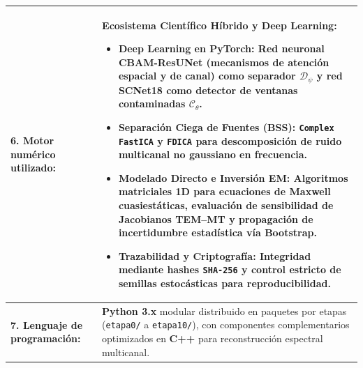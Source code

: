 \documentclass[11pt,letterpaper]{article}
\begin{document}
\begin{tcolorbox}
\begin{tabularx}{\textwidth}{@{} p{4.6cm} X @{}}
    \textbf{6. Motor numérico utilizado:} & 
    \textbf{Ecosistema Científico Híbrido y Deep Learning:}
    \begin{itemize}[leftmargin=1.2em, topsep=2pt, itemsep=1pt]
        \item \textbf{Deep Learning en PyTorch:} Red neuronal \textbf{CBAM-ResUNet} (mecanismos de atención espacial y de canal) como separador $\mathcal{D}_\psi$ y red \textbf{SCNet18} como detector de ventanas contaminadas $\mathcal{C}_\theta$.
        \item \textbf{Separación Ciega de Fuentes (BSS):} \texttt{Complex FastICA} y \texttt{FDICA} para descomposición de ruido multicanal no gaussiano en frecuencia.
        \item \textbf{Modelado Directo e Inversión EM:} Algoritmos matriciales 1D para ecuaciones de Maxwell cuasiestáticas, evaluación de sensibilidad de Jacobianos TEM--MT y propagación de incertidumbre estadística vía Bootstrap.
        \item \textbf{Trazabilidad y Criptografía:} Integridad mediante hashes \texttt{SHA-256} y control estricto de semillas estocásticas para reproducibilidad.
    \end{itemize} \\
    \hline

    \textbf{7. Lenguaje de programación:} & 
    \textbf{Python 3.x} modular distribuido en paquetes por etapas (\texttt{etapa0/} a \texttt{etapa10/}), con componentes complementarios optimizados en \textbf{C++} para reconstrucción espectral multicanal. \\
    \hline


\end{tabularx}
\end{tcolorbox}
\end{document}
